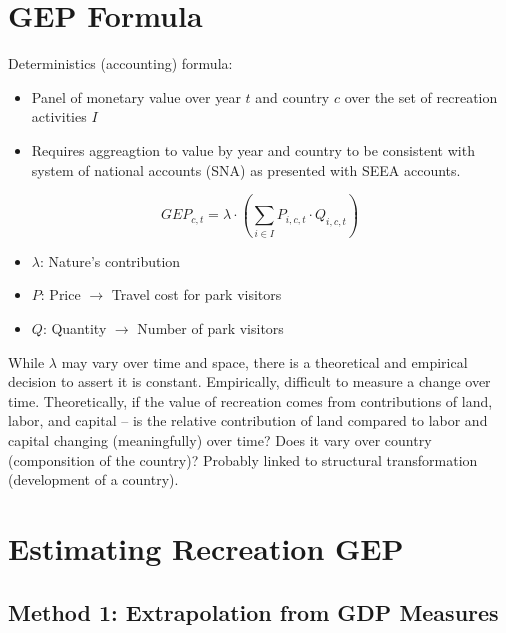 \documentclass[
  letterpaper,
  DIV=11,
  numbers=noendperiod]{scrartcl}
\providecommand{\tightlist}{%
  \setlength{\itemsep}{0pt}\setlength{\parskip}{0pt}}\usepackage{longtable,booktabs,array}
\begin{document}
\hypertarget{gep-formula}{%
\section{GEP Formula}\label{gep-formula}}

Deterministics (accounting) formula:

\begin{itemize}
\tightlist
\item
  Panel of monetary value over year \(t\) and country \(c\) over the set
  of recreation activities \(I\)
\item
  Requires aggreagtion to value by year and country to be consistent
  with system of national accounts (SNA) as presented with SEEA
  accounts.
\end{itemize}

\[
GEP_{c,t} = \lambda \cdot ( \sum_{i \in I} P_{i,c,t} \cdot Q_{i,c,t})
\]

\begin{itemize}
\tightlist
\item
  \(\lambda\): Nature's contribution
\item
  \(P\): Price \(\to\) Travel cost for park visitors
\item
  \(Q\): Quantity \(\to\) Number of park visitors
\end{itemize}

While \(\lambda\) may vary over time and space, there is a theoretical
and empirical decision to assert it is constant. Empirically, difficult
to measure a change over time. Theoretically, if the value of recreation
comes from contributions of land, labor, and capital -- is the relative
contribution of land compared to labor and capital changing
(meaningfully) over time? Does it vary over country (componsition of the
country)? Probably linked to structural transformation (development of a
country).

\hypertarget{estimating-recreation-gep}{%
\section{Estimating Recreation GEP}\label{estimating-recreation-gep}}

\hypertarget{method-1-extrapolation-from-gdp-measures}{%
\subsection{Method 1: Extrapolation from GDP
Measures}\label{method-1-extrapolation-from-gdp-measures}}
\end{document}
